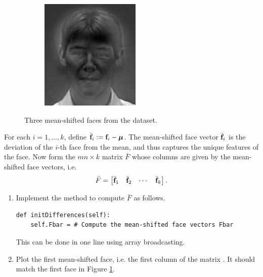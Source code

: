 \begin{figure}
\begin{subfigure}[b]{0.3\textwidth}
\end{subfigure}
\begin{subfigure}[b]{0.3\textwidth}
\includegraphics[width=\textwidth]{differenceFace2.png}
\end{subfigure}
\caption{Three mean-shifted faces from the dataset.}
\label{facialRecognition:differenceFaces}
\end{figure}
For each $i = 1,\ldots, k$, define $\bar{{\bf f}}_i := {\bf f}_i - {\boldsymbol \mu}$.
The mean-shifted face vector $\bar{{\bf f}}_i$ is the deviation of the $i$-th face from the mean, and thus captures the unique features of the face.
Now form the $mn \times k$ matrix $\bar{F}$ whose columns are given by the mean-shifted face vectors, i.e.
\[
\bar{F} = \begin{bmatrix}
\bar{{\bf f}}_1 & \bar{{\bf f}}_2 & \cdots & \bar{{\bf f}}_k
\end{bmatrix}.
\]
\begin{problem}
\leavevmode
\begin{enumerate}
\item Implement the method  to compute $\bar{F}$ as follows.
\begin{lstlisting}
def initDifferences(self):
    self.Fbar = # Compute the mean-shifted face vectors Fbar
\end{lstlisting}
This can be done in one line using array broadcasting.
\item
Plot the first mean-shifted face, i.e. the first column of the matrix .
It should match the first face in Figure \ref{facialRecognition:differenceFaces}.
\end{enumerate}
\end{problem}

